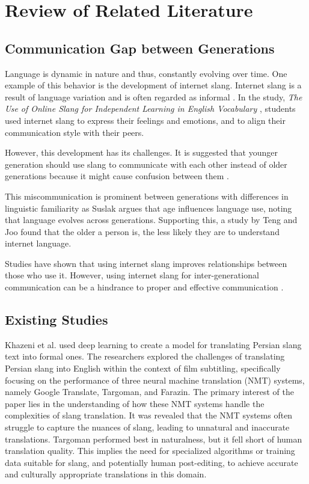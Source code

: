 \chapter{Review of Related Literature}
\label{sec:relatedlit}

\section{Communication Gap between Generations}
Language is dynamic in nature and thus, constantly evolving over time. One example of this behavior is the development of internet slang. Internet slang is a result of language variation and is often regarded as informal \cite{Liu_Gui_Zuo_Dai_2019}. In the study, \textit{The Use of Online Slang for Independent Learning in English Vocabulary} \cite{Ambarsari_Amrullah_Nawawi_2020}, students used internet slang to express their feelings and emotions, and to align their communication style with their peers. 

However, this development has its challenges. It is suggested that younger generation should use slang to communicate with each other instead of older generations because it might cause confusion between them \cite{Jeresano_Carretero_2022}.

This miscommunication is prominent between generations with differences in linguistic familiarity as Suslak \cite{SUSLAK2009199} argues that age influences language use, noting that language evolves across generations.
Supporting this, a study by Teng and Joo \cite{Teng_Joo2023} found that the older a person is, the less likely they are to understand internet language.

Studies have shown that using internet slang improves relationships between those who use it. However, using internet slang for inter-generational communication can be a hindrance to proper and effective communication \cite{gonzagaforda}.


\section{Existing Studies}
Khazeni et al. \cite{Khazeni} used deep learning to create a model for translating Persian slang text into formal ones. The researchers explored the challenges of translating Persian slang into English within the context of film subtitling, specifically focusing on the performance of three neural machine translation (NMT) systems, namely Google Translate, Targoman, and Farazin. The primary interest of the paper lies in the understanding of how these NMT systems handle the complexities of slang translation. It was revealed that the NMT systems often struggle to capture the nuances of slang, leading to unnatural and inaccurate translations. Targoman performed best in naturalness, but it fell short of human translation quality. This implies the need for specialized algorithms or training data suitable for slang, and potentially human post-editing, to achieve accurate and culturally appropriate translations in this domain.
 

